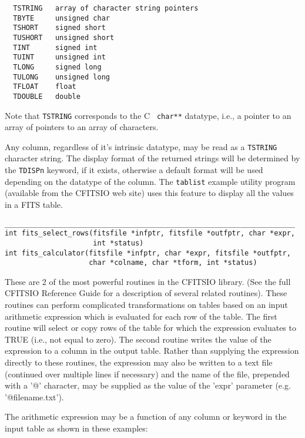 \documentclass[11pt]{article}
\begin{document}
\begin{verbatim}
  TSTRING   array of character string pointers
  TBYTE     unsigned char
  TSHORT    signed short
  TUSHORT   unsigned short
  TINT      signed int
  TUINT     unsigned int
  TLONG     signed long
  TULONG    unsigned long
  TFLOAT    float
  TDOUBLE   double
\end{verbatim}

Note that {\tt TSTRING} corresponds to the C {\tt
char**} datatype, i.e., a pointer to an array of pointers to an array
of characters.

Any column, regardless of it's intrinsic datatype, may be read as a
{\tt TSTRING} character string. The display format of the returned
strings will be determined by the {\tt TDISPn} keyword, if it exists,
otherwise a default format will be used depending on the datatype of
the column.  The {\tt tablist} example utility program (available from
the CFITSIO web site) uses this feature to display all the values in a
FITS table.

\begin{verbatim}
_____________________________________________________________________
int fits_select_rows(fitsfile *infptr, fitsfile *outfptr, char *expr,
                     int *status)
int fits_calculator(fitsfile *infptr, char *expr, fitsfile *outfptr,
                    char *colname, char *tform, int *status) 
\end{verbatim}

These are 2 of the most powerful routines in the CFITSIO library.  (See
the full CFITSIO Reference Guide for a description of several related
routines).  These routines can perform complicated transformations on
tables based on an input arithmetic expression which is evaluated for
each row of the table.  The first routine will select or copy rows of
the table for which the expression evaluates to TRUE (i.e., not equal
to zero).  The second routine writes the value of the expression to a
column in the output table.  Rather than supplying the expression
directly to these routines, the expression may also be written to a
text file (continued over multiple lines if necessary) and the name of
the file, prepended with a '@' character, may be supplied as the value
of the 'expr' parameter (e.g.  '@filename.txt').

The arithmetic expression may be a function of any column or keyword in
the input table as shown in these examples:
\end{document}
